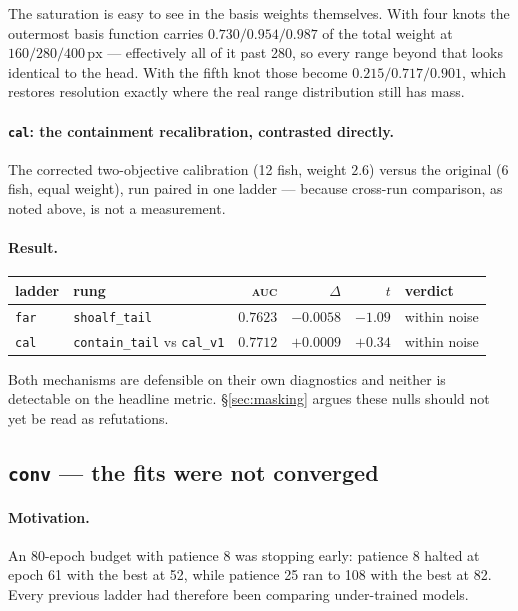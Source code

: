 \documentclass[11pt,a4paper]{article}
\newcommand{\uu}[1]{\ensuremath{\,\mathrm{#1}}}  %
\newcommand{\nul}[1]{\textcolor{nullc}{#1}}
\newcommand{\auc}{\textsc{auc}}
\newcommand{\code}[1]{\texttt{\small #1}}
\begin{document}
The saturation is easy to see in the basis weights themselves. With four knots the
outermost basis function carries $0.730 / 0.954 / 0.987$ of the total weight at
$160 / 280 / 400\uu{px}$ --- effectively all of it past 280, so every range beyond that
looks identical to the head. With the fifth knot those become $0.215 / 0.717 / 0.901$,
which restores resolution exactly where the real range distribution still has mass.

\paragraph{\texttt{cal}: the containment recalibration, contrasted directly.}
The corrected two-objective calibration (12 fish, weight $2.6$) versus the original
(6 fish, equal weight), run paired in one ladder --- because cross-run comparison, as
noted above, is not a measurement.

\paragraph{Result.}
\begin{center}\small
\begin{tabular}{llrrrl}
\toprule
ladder & rung & \auc{} & $\Delta$ & $t$ & verdict \\
\midrule
\code{far} & \code{shoalf\_tail} & $0.7623$ & $-0.0058$ & $-1.09$ & \nul{within noise} \\
\code{cal} & \code{contain\_tail} vs \code{cal\_v1} & $0.7712$ & $+0.0009$ & $+0.34$ & \nul{within noise} \\
\bottomrule
\end{tabular}
\end{center}

Both mechanisms are defensible on their own diagnostics and neither is detectable on the
headline metric. \S\ref{sec:masking} argues these nulls should not yet be read as
refutations.

\subsection{\texttt{conv} --- the fits were not converged}

\paragraph{Motivation.}
An 80-epoch budget with patience 8 was stopping early: patience 8 halted at epoch 61 with
the best at 52, while patience 25 ran to 108 with the best at 82. Every previous ladder
had therefore been comparing under-trained models.
\end{document}
